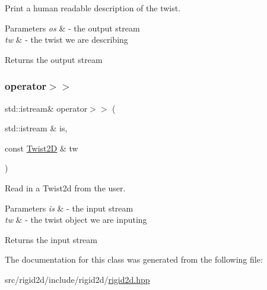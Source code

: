 Print a human readable description of the twist. 


\begin{DoxyParams}{Parameters}
{\em os} & -\/ the output stream \\
\hline
{\em tw} & -\/ the twist we are describing \\
\hline
\end{DoxyParams}
\begin{DoxyReturn}{Returns}
the output stream 
\end{DoxyReturn}
\mbox{\label{classrigid2d_1_1Twist2D_ab527608eeb57bab63fae6b12e45f6537}} 
\subsubsection{\texorpdfstring{operator$>$$>$}{operator>>}}
{\footnotesize\ttfamily std\+::istream\& operator$>$$>$ (\begin{DoxyParamCaption}\item[{std\+::istream \&}]{is,  }\item[{const \hyperlink{classrigid2d_1_1Twist2D}{Twist2D} \&}]{tw }\end{DoxyParamCaption})\hspace{0.3cm}{\ttfamily [friend]}}



Read in a Twist2d from the user. 


\begin{DoxyParams}{Parameters}
{\em is} & -\/ the input stream \\
\hline
{\em tw} & -\/ the twist object we are inputing \\
\hline
\end{DoxyParams}
\begin{DoxyReturn}{Returns}
the input stream 
\end{DoxyReturn}


The documentation for this class was generated from the following file\+:\begin{DoxyCompactItemize}
\item 
src/rigid2d/include/rigid2d/\hyperlink{rigid2d_8hpp}{rigid2d.\+hpp}\end{DoxyCompactItemize}

